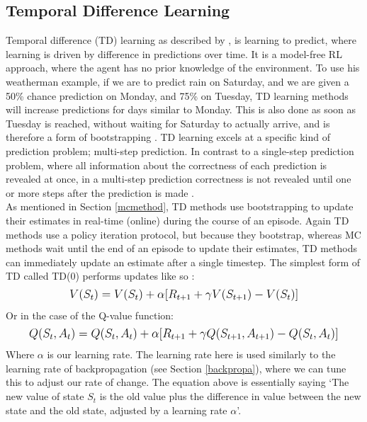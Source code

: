 \documentclass[12pt]{article}
\begin{document}
\subsection{Temporal Difference Learning}
Temporal difference (TD) learning as described by \textcite{sutton1988learning}, is learning to predict, where learning is driven by difference in predictions over time. It is a model-free RL approach, where the agent has no prior knowledge of the environment. To use his weatherman example, if we are to predict rain on Saturday, and we are given a 50\% chance prediction on Monday, and 75\% on Tuesday, TD learning methods will increase predictions for days similar to Monday. This is also done as soon as Tuesday is reached, without waiting for Saturday to actually arrive, and is therefore a form of bootstrapping \autocite{sutton1988learning}. TD learning excels at a specific kind of prediction problem; multi-step prediction. In contrast to a single-step prediction problem, where all information about the correctness of each prediction is revealed at once, in a multi-step prediction correctness is not revealed until one or more steps after the prediction is made \autocite{sutton1988learning}. 
\\\newline As mentioned in Section \ref{mcmethod}, TD methods use bootstrapping to update their estimates in real-time (online) during the course of an episode. Again TD methods use a policy iteration protocol, but because they bootstrap, whereas MC methods wait until the end of an episode to update their estimates, TD methods can immediately update an estimate after a single timestep. The simplest form of TD called TD(0) performs updates like so \autocite{sutton1988learning}:
\begin{equation}
    \mathlarger{
        V(S_t) = V(S_t) + \alpha[R_{t+1}+ \gamma V(S_{t+1}) - V(S_t)]
    }
\end{equation}
Or in the case of the Q-value function:
\begin{equation}
    \mathlarger{
        Q(S_t,A_t) = Q(S_t,A_t) + \alpha[R_{t+1}+ \gamma Q(S_{t+1},A_{t+1}) - Q(S_t,A_t)]
    }
\end{equation}
Where $\alpha$ is our learning rate. The learning rate here is used similarly to the learning rate of backpropagation (see Section \ref{backpropa}), where we can tune this to adjust our rate of change. The equation above is essentially saying `The new value of state $S_t$ is the old value plus the difference in value between the new state and the old state, adjusted by a learning rate $\alpha$'.
\end{document}
